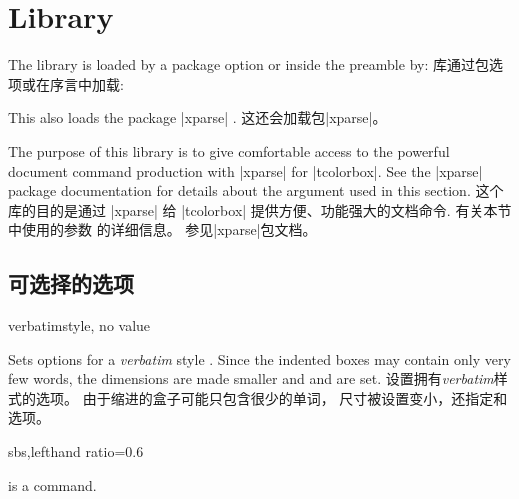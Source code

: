\section{Library }\label{sec:xparse}%
%
\begin{stripedbox}
The library is loaded by a package option or inside the preamble by:
\tcblower
库通过包选项或在序言中加载:
\end{stripedbox}

\begin{dispListing}
\end{dispListing}

\begin{stripedbox}
This also loads the package |xparse| %
.
\tcblower
这还会加载包|xparse|。
\end{stripedbox}

\begin{stripedbox}
The purpose of this library is to give comfortable access to the powerful document command production with |xparse| for |tcolorbox|.
See the |xparse| package documentation %
for details about the argument  used in this section.
\tcblower
这个库的目的是通过 |xparse| 给 |tcolorbox| 提供方便、功能强大的文档命令.
有关本节中使用的参数  的详细信息。 参见|xparse|包文档。
\end{stripedbox}

\subsection{可选择的选项}\label{subsec:xparse_options}

\begin{docTcbKey}{verbatim}{}{style, no value}
\begin{stripedbox}
Sets options for a \textit{verbatim} style .
Since the indented boxes may contain only very few words, 
the dimensions are made smaller and  and  are set.
\tcblower
设置拥有\textit{verbatim}样式的选项。%
由于缩进的盒子可能只包含很少的单词，%
尺寸被设置变小，还指定和选项。
\end{stripedbox}

\begin{dispExample*}{sbs,lefthand ratio=0.6}

\myverb{\textbf} is a \myverb{\LaTeX} command.
\end{dispExample*}
\end{docTcbKey}

